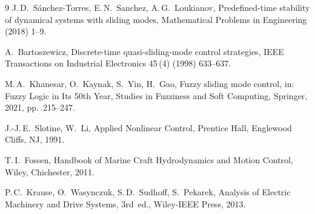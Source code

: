 \documentclass[preprint,12pt]{elsarticle}
\begin{document}
\begin{thebibliography}{9}
J.\,D.~S\'anchez-Torres, E.\,N.~Sanchez, A.\,G.~Loukianov,
Predefined-time stability of dynamical systems with sliding modes,
Mathematical Problems in Engineering (2018) 1--9.

A.~Bartoszewicz,
Discrete-time quasi-sliding-mode control strategies,
IEEE Transactions on Industrial Electronics 45\,(4) (1998) 633--637.

M.\,A.~Khanesar, O.~Kaynak, S.~Yin, H.~Gao,
Fuzzy sliding mode control,
in: Fuzzy Logic in Its 50th Year, Studies in Fuzziness and Soft Computing, Springer, 2021, pp.~215--247.

J.-J.\,E.~Slotine, W.~Li,
Applied Nonlinear Control,
Prentice Hall, Englewood Cliffs, NJ, 1991.

T.\,I.~Fossen,
Handbook of Marine Craft Hydrodynamics and Motion Control,
Wiley, Chichester, 2011.

P.\,C.~Krause, O.~Wasynczuk, S.\,D.~Sudhoff, S.~Pekarek,
Analysis of Electric Machinery and Drive Systems, 3rd~ed.,
Wiley-IEEE Press, 2013.

\end{thebibliography}
\end{document}
